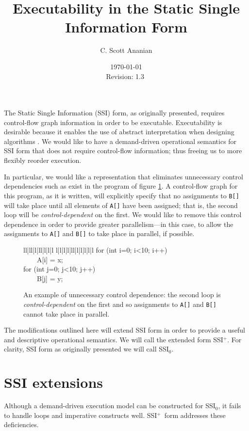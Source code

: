 \documentclass[12pt,notitlepage,twoside]{article}
\title{Executability in the Static Single Information Form}
\author{C. Scott Ananian}
\date{\today \\ $ $Revision: 1.3 $ $}
\newenvironment{samplecode}[1][1]
  {\setlength{\tabcolsep}{2\tabcolsep}%
\renewcommand{\>}{~~~~}%
\newcommand{\comment}[1]{\rm\it // ##1}%
\newcommand{\com}[1]{\comment{##1}}%
\newcommand{\ells}[1]{\ifcase#1\or l\or l|l\or l|l|l\or l|l|l|l\or
l|l|l|l|l\or l|l|l|l|l|l\fi}%
\begin{center}\tt\begin{tabular}{\ells{#1}}}
  {\end{tabular}\end{center}}
\newcommand{\ssizero}{SSI$_0$}
\newcommand{\ssiplus}{SSI$^+$}
\begin{document}


\maketitle

The Static Single Information (SSI) form, as originally presented,
requires control-flow graph information in order to be executable.
Executability is desirable because it enables the use of abstract
interpretation when designing algorithms \cite{pingali90:dfg}.  We
would like to have a demand-driven operational semantics for SSI form
that does not require control-flow information; thus freeing us to
more flexibly reorder execution.

In particular, we would like a representation that eliminates
unnecessary control dependencies such as exist in the program of
figure \ref{fig:ctrldep}.  A control-flow graph for this program, as
it is written, will explicitly specify that no assignments to
\texttt{B[]} will take place until all elements of \texttt{A[]} have
been assigned; that is, the second loop will be
\textit{control-dependent} on the first.  We would like to remove this
control dependence in order to provide greater parallelism---in this
case, to allow the assignments to \texttt{A[]} and \texttt{B[]} to
take place in parallel, if possible.

\begin{figure}[t]
\begin{samplecode}
for (int i=0; i<10; i++)\\
\>A[i] = x;\\
for (int j=0; j<10; j++)\\
\>B[j] = y;\\
\end{samplecode}
\caption{An example of unnecessary control dependence: the second loop
is \textit{control-dependent} on the first and so assignments to
\texttt{A[]} and \texttt{B[]} cannot take place in parallel.}
\label{fig:ctrldep}
\end{figure}

The modifications outlined here will extend SSI form in order to
provide a useful and descriptive operational semantics.  We will call
the extended form \ssiplus.  For clarity, SSI form as originally
presented we will call \ssizero.

\section{SSI extensions}
Although a demand-driven execution model can be constructed for
\ssizero,  it fails to handle loops and imperative
constructs well. \ssiplus\ form addresses these deficiencies.
\end{document}
